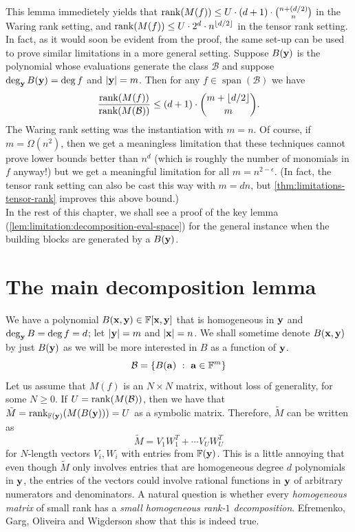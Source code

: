   This lemma immedietely yields that $\operatorname{rank}(M(f)) \leq U\cdot (d+1) \cdot \binom{n+(d/2)}{n}$ in the Waring rank setting, and $\operatorname{rank}(M(f)) \leq U\cdot 2^{d} \cdot n^{\lfloor d/2 \rfloor}$ in the tensor rank setting. \\

  In fact, as it would soon be evident from the proof, the same set-up can be used to prove similar limitations in a more general setting. Suppose $B(\mathbf{y})$ is the polynomial whose evaluations generate the class $\mathcal{B}$ and suppose $\deg_{\mathbf{y}} B(\mathbf{y}) = \deg f$ and $\left|\mathbf{y}\right| = m$. Then for any $f \in \operatorname{span}(\mathcal{B})$ we have
  \[
    \frac{\operatorname{rank}(M(f))}{\operatorname{rank}(M(\mathcal{B}))} \leq (d + 1) \cdot \binom{m + \lfloor d/2 \rfloor}{m}. 
  \]
  The Waring rank setting was the instantiation with $m = n$. Of course, if $m = \Omega(n^2)$, then we get a meaningless limitation that these techniques cannot prove lower bounds better than $n^d$ (which is roughly the number of monomials in $f$ anyway!) but we get a meaningful limitation for all $m = n^{2 - \epsilon}$. (In fact, the tensor rank setting can also be cast this way with $m = dn$, but \autoref{thm:limitations-tensor-rank} improves this above bound.)\\

  In the rest of this chapter, we shall see a proof of the key lemma (\autoref{lem:limitation:decomposition-eval-space}) for the general instance when the building blocks are generated by a $B(\mathbf{y})$.

\section{The main decomposition lemma}

We have a polynomial $B(\mathbf{x}, \mathbf{y}) \in \mathbb{F}[\mathbf{x}, \mathbf{y}]$ that is homogeneous in $\mathbf{y}$ and $\deg_{\mathbf{y}} B = \deg f = d$; let $\left|\mathbf{y}\right| = m$ and $\left|\mathbf{x}\right| = n$. We shall sometime denote $B(\mathbf{x}, \mathbf{y})$ by just $B(\mathbf{y})$ as we will be more interested in $B$ as a function of $\mathbf{y}$.
\[
  \mathcal{B} = \left\{{B(\mathbf{a})}\ : \ {\mathbf{a} \in \mathbb{F}^m}\right\}
\]
Let us assume that $M(f)$ is an $N\times N$ matrix, without loss of generality, for some $N \geq 0$. 
If $U = \operatorname{rank}(M(\mathcal{B}))$, then we have that $\tilde{M} = \operatorname{rank}_{\mathbb{F}(\mathbf{y})}(M(B(\mathbf{y}))) = U$ as a symbolic matrix. Therefore, $\tilde{M}$ can be written as
\[
  \tilde{M} = V_1 W_1^T + \cdots V_U W_U^T
\]
for $N$-length vectors $V_i, W_i$ with entries from $\mathbb{F}(\mathbf{y})$. This is a little annoying that even though $\tilde{M}$ only involves entries that are homogeneous degree $d$ polynomials in $\mathbf{y}$, the entries of the vectors could involve rational functions in $\mathbf{y}$ of arbitrary numerators and denominators. A natural question is whether every \emph{homogeneous matrix} of small rank has a \emph{small homogeneous rank-$1$ decomposition}. Efremenko, Garg, Oliveira and Wigderson show that this is indeed true.

